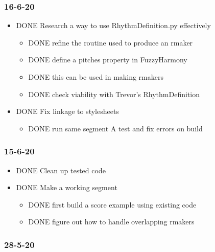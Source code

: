 \documentclass[11pt]{article}
\begin{document}
\subsubsection*{16-6-20}
\label{sec:org06cd583}

\begin{itemize}
\item DONE Research a way to use RhythmDefinition.py effectively
\begin{itemize}
\item DONE refine the routine used to produce an rmaker
\item DONE define a pitches property in FuzzyHarmony
\item DONE this can be used in making rmakers
\item DONE check viability with Trevor's RhythmDefinition
\end{itemize}

\item DONE Fix linkage to stylesheets
\begin{itemize}
\item DONE run same segment A test and fix errors on build
\end{itemize}
\end{itemize}

\subsubsection*{15-6-20}
\label{sec:org771c963}

\begin{itemize}
\item DONE Clean up tested code
\item DONE Make a working segment
\begin{itemize}
\item DONE first build a score example using existing code
\item DONE figure out how to handle overlapping rmakers
\end{itemize}
\end{itemize}

\subsubsection*{28-5-20}
\label{sec:org6a12880}
\end{document}
